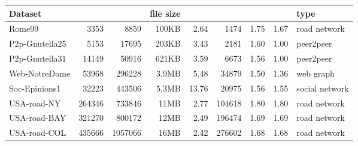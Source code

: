 \documentclass[11pt]{article}
\begin{document}
\begin{table}[!ht]
\setlength{\tabcolsep}{4.5pt}
\begin{adjustbox}{width=\textwidth,totalheight=\textheight,keepaspectratio}
\begin{small}
\begin{tabular}{l|rrrrrrr|l}
\hline
Dataset &  &  & file size &   &  &  &  &  type  \\
\hline
Rome99           & 3353       & 8859       & 100KB              & 2.64                    & 1474                    & 1.75                              & 1.67                                                  & road network                      \\
P2p-Gnutella25   & 5153       & 17695      & 203KB              & 3.43                    & 2181                    & 1.60                              & 1.00                                                  & peer2peer                         \\
P2p-Gnutella31   & 14149      & 50916      & 621KB              & 3.59                    & 6673                    & 1.56                              & 1.00                                                  & peer2peer                         \\
Web-NotreDame    & 53968      & 296228     & 3,9MB              & 5.48                    & 34879                   & 1.50                              & 1.36                                                  & web graph                         \\
Soc-Epinions1    & 32223      & 443506     & 5,3MB              & 13.76                   & 20975                   & 1.56                              & 1.55                                                  & social network                    \\
USA-road-NY      & 264346     & 733846     & 11MB               & 2.77                    & 104618                  & 1.80                              & 1.80                                                  & road network                      \\
USA-road-BAY     & 321270     & 800172     & 12MB               & 2.49                    & 196474                  & 1.69                              & 1.69                                                  & road network                      \\
USA-road-COL     & 435666     & 1057066    & 16MB               & 2.42                    & 276602                  & 1.68                              & 1.68                                                  & road network                      \\

\end{tabular}
\end{small}
\end{adjustbox}
\end{table}
\end{document}
